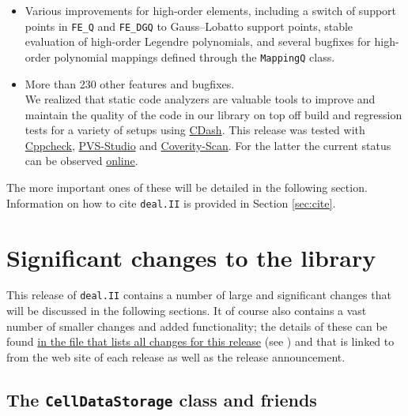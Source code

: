 \documentclass{ansarticle-preprint}
\newcommand{\specialword}[1]{\texttt{#1}}
\newcommand{\dealii}{{\specialword{deal.II}}}
\begin{document}
\begin{itemize}
\item Various improvements for high-order elements, including a switch of
  support points in \texttt{FE\_Q} and \texttt{FE\_DGQ} to Gauss--Lobatto
  support points, stable evaluation of high-order Legendre polynomials, and several
  bugfixes for high-order polynomial mappings defined through the
  \texttt{MappingQ} class.


\item More than 230 other features and bugfixes.\\
  We realized that static code analyzers are valuable tools to improve and maintain the quality of the code in our library 
  on top off build and regression tests for a variety of setups using \href{https://cdash.kyomu.43-1.org/index.php?project=deal.II}{CDash}.
  This release was tested with \href{http://cppcheck.sourceforge.net/}{Cppcheck}, 
  \href{https://www.viva64.com/en/pvs-studio/}{PVS-Studio} and \href{https://scan.coverity.com/}{Coverity-Scan}. 
  For the latter the current status can be observed \href{https://scan.coverity.com/projects/deal-ii}{online}.
\end{itemize}
The more important ones of these will be detailed in the following section.
Information on how to cite \dealii{} is provided in Section \ref{sec:cite}.




\section{Significant changes to the library}

This release of \dealii{} contains a number of large and significant changes
that will be discussed in the following sections. It of course also contains a
vast number of smaller changes and added functionality; the details of these
can be found
\href{https://www.dealii.org/8.5.0/doxygen/deal.II/changes_between_8_4_and_8_5.html}{in the file that lists all changes for this release} (see \cite{changes85})
and that is linked to from the web site of each release as well as the
release announcement.


\subsection{The \texttt{CellDataStorage} class and friends}
\end{document}

